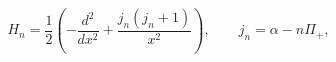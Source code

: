 \begin{equation}
H_n=\frac{1}{2}\left(-\frac{d^2}{dx^2}+\frac{j_n(j_n+1)}{x^2
}\right),
\qquad j_n=\alpha -n\Pi_+,
\label{hj}
\end{equation}

